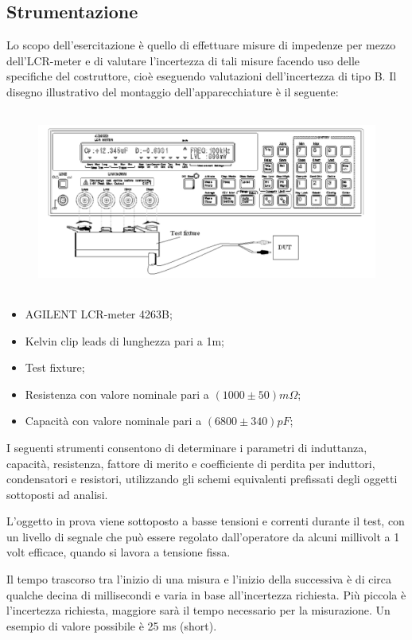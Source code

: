 \subsection{Strumentazione}
\label{sub:strum}
Lo scopo dell’esercitazione è quello di effettuare misure di impedenze per mezzo 
dell’LCR-meter e di valutare l’incertezza di tali misure facendo uso delle specifiche 
del costruttore, cioè eseguendo valutazioni dell’incertezza di tipo B.
Il disegno illustrativo del montaggio dell’apparecchiature è il seguente:

\begin{figure}[h]
    \centering
    \includegraphics[height=6cm]{media/LCR_meter.png}
    \label{fig:LCR_meter}
\end{figure}
\FloatBarrier

\begin{itemize}
    \item AGILENT LCR-meter 4263B;
    \item Kelvin clip leads di lunghezza pari a 1m;
    \item Test fixture;
    \item Resistenza con valore nominale pari a $(1000\pm50)m\Omega$;
    \item Capacità con valore nominale pari a $(6800\pm340)pF$;
\end{itemize}


I seguenti strumenti consentono di determinare i parametri di induttanza, capacità, resistenza, fattore di merito e coefficiente di perdita per induttori, condensatori e resistori, utilizzando gli schemi equivalenti prefissati degli oggetti sottoposti ad analisi.

L'oggetto in prova viene sottoposto a basse tensioni e correnti durante il test, con un livello di segnale che può essere regolato dall'operatore da alcuni millivolt a 1 volt efficace, quando si lavora a tensione fissa.

Il tempo trascorso tra l'inizio di una misura e l'inizio della successiva è di circa qualche decina di millisecondi e varia in base all'incertezza richiesta. Più piccola è l'incertezza richiesta, maggiore sarà il tempo necessario per la misurazione. Un esempio di valore possibile è 25 ms (short).

